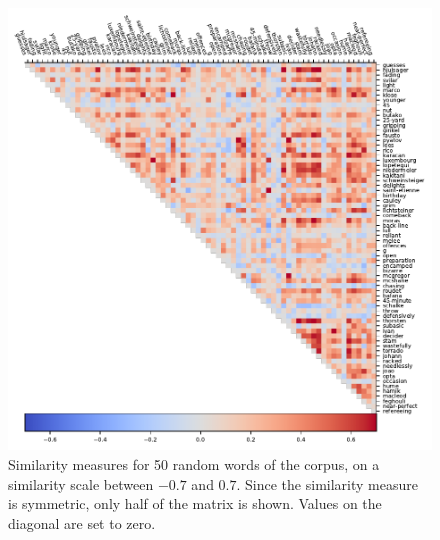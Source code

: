 \documentclass[10pt, a4paper]{UUThesisTemplate}
\begin{document}
\begin{figure}
\includegraphics{figures/similarity_matrix.pdf}
\caption{Similarity measures for 50 random words of the corpus, on a similarity scale between $-0.7$ and $0.7$. Since the similarity measure is symmetric, only half of the matrix is shown. Values on the diagonal are set to zero.}\label{fig:simmatrix}
\end{figure}
\end{document}
